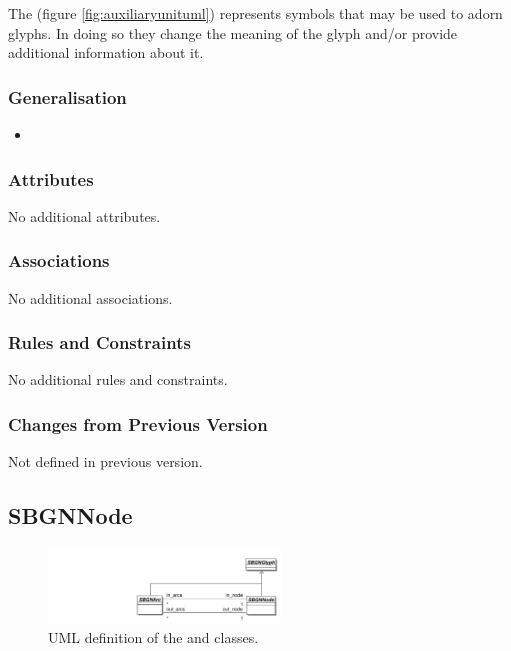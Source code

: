  The  (figure \ref{fig:auxiliaryunituml}) represents symbols that may be used to
adorn glyphs. In doing so they change the meaning of the glyph and/or provide
additional information about it.

\subsubsection{Generalisation}

\begin{itemize}
\item {}
\end{itemize}

\subsubsection{Attributes}

No additional attributes.

\subsubsection{Associations}

No additional associations.

\subsubsection{Rules and Constraints}

No additional rules and constraints.

\subsubsection{Changes from Previous Version}

Not defined in previous version.


\subsection{SBGNNode}
\label{defn:SBGNNode}

\begin{figure}[htb]
  \centering
  \includegraphics[width=0.55\textwidth]{images/sbgnnodearcuml}
\caption{UML definition of the  and
   classes.}
  \label{fig:sbgnnodearcuml}
\end{figure}
 
